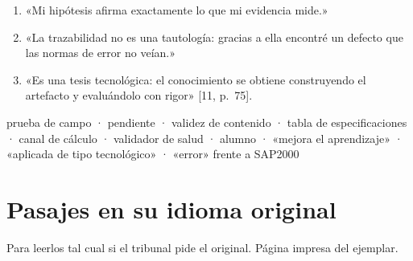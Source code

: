 \documentclass[11pt,a4paper]{article}
\begin{document}
\begin{memorizar}
\begin{enumerate}[leftmargin=1.5em,itemsep=2pt]
\item «Mi hipótesis afirma exactamente lo que mi evidencia mide.»
\item «La trazabilidad no es una tautología: gracias a ella encontré un defecto que las normas de error no veían.»
\item «Es una tesis tecnológica: el conocimiento se obtiene construyendo el artefacto y evaluándolo con rigor» [11, p.~75].
\end{enumerate}
\end{memorizar}

\begin{cuidado}
prueba de campo · pendiente · validez de contenido · tabla de especificaciones · canal de cálculo · validador de salud · alumno · «mejora el aprendizaje» · «aplicada de tipo tecnológico» · «error» frente a SAP2000
\end{cuidado}

\appendix
\section{Pasajes en su idioma original}\label{anx:ingles}

Para leerlos tal cual si el tribunal pide el original. Página impresa del ejemplar.
\end{document}
